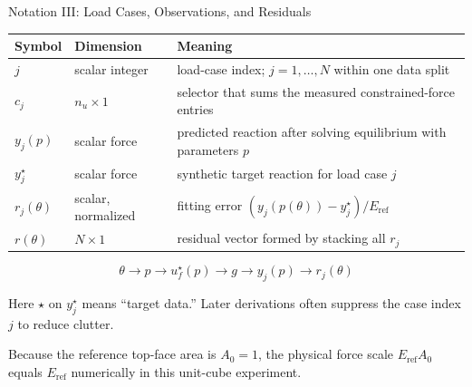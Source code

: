\documentclass[aspectratio=169,10pt]{beamer}
\newcommand{\eref}{E_{\mathrm{ref}}}
\begin{document}
\begin{frame}{Notation III: Load Cases, Observations, and Residuals}
  \small
  \begin{table}
    \centering
    \begin{tabular}{lll}
      \toprule
      Symbol & Dimension & Meaning \\
      \midrule
      $j$ & scalar integer &
      load-case index; $j=1,\ldots,N$ within one data split \\
      $c_j$ & $n_u\times1$ &
      selector that sums the measured constrained-force entries \\
      $y_j(p)$ & scalar force &
      predicted reaction after solving equilibrium with parameters $p$ \\
      $y_j^\star$ & scalar force &
      synthetic target reaction for load case $j$ \\
      $r_j(\theta)$ & scalar, normalized &
      fitting error $(y_j(p(\theta))-y_j^\star)/\eref$ \\
      $r(\theta)$ & $N\times1$ &
      residual vector formed by stacking all $r_j$ \\
      \bottomrule
    \end{tabular}
  \end{table}

  \[
    \boxed{
      \theta\longrightarrow p
      \longrightarrow u_f^\star(p)
      \longrightarrow g
      \longrightarrow y_j(p)
      \longrightarrow r_j(\theta)
    }
  \]

  Here $\star$ on $y_j^\star$ means ``target data.'' Later derivations often
  suppress the case index $j$ to reduce clutter.

  Because the reference top-face area is $A_0=1$, the physical force scale
  $\eref A_0$ equals $\eref$ numerically in this unit-cube experiment.
\end{frame}
\end{document}
